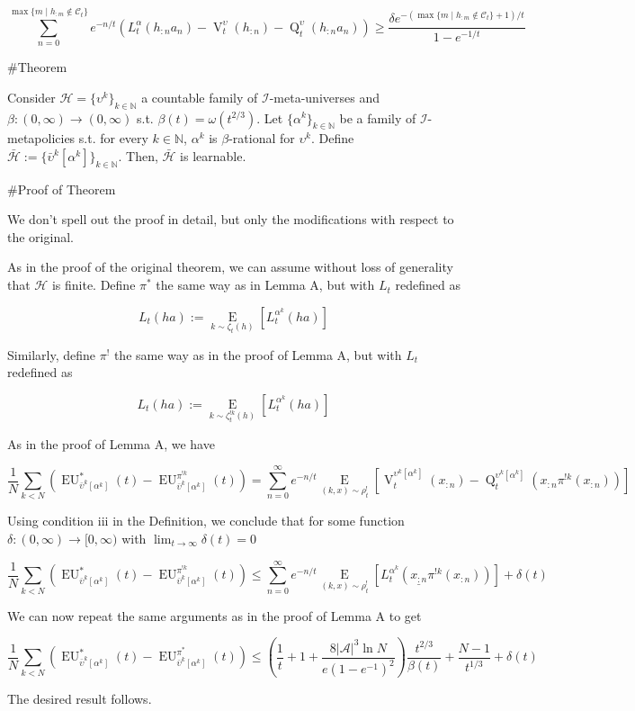 \documentclass[a4paper]{article}
\newcommand{\E}[1]{\underset{#1}{\operatorname{E}}}
\newcommand{\Nats}{\mathbb{N}}
\newcommand{\Abs}[1]{\lvert #1 \rvert}
\newcommand{\A}{\mathcal{A}}
\newcommand{\I}{\mathcal{I}}
\newcommand{\Hy}{\mathcal{H}}
\newcommand{\Co}{\mathcal{C}}
\newcommand{\V}{\operatorname{V}}
\newcommand{\Q}{\operatorname{Q}}
\newcommand{\EU}{\operatorname{EU}}
\begin{document}
$$\sum_{n=0}^{\max\{m \mid h_{:m} \not\in\Co_t\}} e^{-n/t}(L^\alpha_t(h_{:n}a_n) - \V^\upsilon_t(h_{:n}) - \Q^\upsilon_t(h_{:n}a_n)) \geq \frac{\delta e^{-(\max\{m \mid h_{:m} \not\in\Co_t\}+1)/t}}{1-e^{-1/t}}$$

\#Theorem

Consider $\Hy = \{\upsilon^k\}_{k \in \Nats}$ a countable family of $\I$-meta-universes and $\beta: (0,\infty) \rightarrow (0,\infty)$ s.t. $\beta(t) = \omega(t^{2/3})$. Let $\{\alpha^k\}_{k \in \Nats}$ be a family of $\I$-metapolicies s.t. for every $k \in \Nats$, $\alpha^k$ is $\beta$-rational for $\upsilon^k$. Define $\bar{\Hy}:=\{\bar{\upsilon}^k[\alpha^k]\}_{k \in \Nats}$. Then, $\bar{\Hy}$ is learnable.

\#Proof of Theorem

We don't spell out the proof in detail, but only the modifications with respect to the original.

As in the proof of the original theorem, we can assume without loss of generality that $\Hy$ is finite. Define $\pi^*$ the same way as in Lemma A, but with $L_t$ redefined as

$$L_t(ha):=\E{k\sim\zeta_t(h)}[L^{\alpha^k}_t(ha)]$$

Similarly, define $\pi^!$ the same way as in the proof of Lemma A, but with $L_t$ redefined as

$$L_t(ha):=\E{k\sim\zeta^{!k}_t(h)}[L^{\alpha^k}_t(ha)]$$

As in the proof of Lemma A, we have

$$\frac{1}{N}\sum_{k < N}(\EU_{\bar{\upsilon}^k[\alpha^k]}^{*}(t) - \EU_{\bar{\upsilon}^k[\alpha^k]}^{\pi^{!k}}(t))=\sum_{n=0}^\infty e^{-n/t} \E{(k,x)\sim\rho^!_t}[\V^{\upsilon^k[\alpha^k]}_t(x_{:n})-\Q^{\upsilon^k[\alpha^k]}_t(x_{:n}\pi^{!k}(x_{:n}))]$$

Using condition iii in the Definition, we conclude that for some function $\delta:(0,\infty)\rightarrow[0,\infty)$ with $\lim_{t\rightarrow\infty}\delta(t)=0$

$$\frac{1}{N}\sum_{k < N}(\EU_{\bar{\upsilon}^k[\alpha^k]}^{*}(t) - \EU_{\bar{\upsilon}^k[\alpha^k]}^{\pi^{!k}}(t)) \leq \sum_{n=0}^\infty e^{-n/t} \E{(k,x)\sim\rho^!_t}[L^{\alpha^k}_t(\underline{x_{:n}}\pi^{!k}(x_{:n}))]+\delta(t)$$

We can now repeat the same arguments as in the proof of Lemma A to get

$$\frac{1}{N}\sum_{k < N}(\EU_{\bar{\upsilon}^k[\alpha^k]}^{*}(t) - \EU_{\bar{\upsilon}^k[\alpha^k]}^{\pi^{*}}(t)) \leq (\frac{1}{t}+1+\frac{8 \Abs{\A}^3 \ln{N}}{e(1-e^{-1})^2})\frac{t^{2/3}}{\beta(t)}+\frac{N-1}{t^{1/3}}+\delta(t)$$

The desired result follows.
\end{document}
